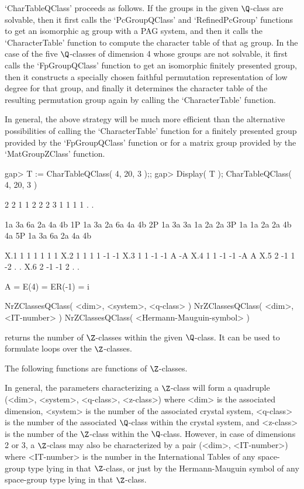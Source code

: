 `CharTableQClass' proceeds as follows.  If the groups in the given
$\Q$-class are solvable, then it first calls the `PcGroupQClass' and
`RefinedPcGroup' functions to get an isomorphic ag group with a PAG
system, and then it calls the `CharacterTable' function to compute the
character table of that ag group.  In the case of the five
$\Q$-classes of dimension 4 whose groups are not solvable, it first
calls the `FpGroupQClass' function to get an isomorphic finitely
presented group, then it constructs a specially chosen faithful
permutation representation of low degree for that group, and finally
it determines the character table of the resulting permutation group
again by calling the `CharacterTable' function.

In general, the above strategy will be much more efficient than the
alternative possibilities of calling the `CharacterTable' function for a
finitely presented group provided by the `FpGroupQClass' function or
for a matrix group provided by the `MatGroupZClass' function.

\beginexample
gap> T := CharTableQClass( 4, 20, 3 );;
gap> Display( T );
CharTableQClass( 4, 20, 3 )

     2  2  1  1  2  2  2
     3  1  1  1  1  .  .

       1a 3a 6a 2a 4a 4b
    1P 1a 3a 2a 6a 4a 4b
    2P 1a 3a 3a 1a 2a 2a
    3P 1a 1a 2a 2a 4b 4a
    5P 1a 3a 6a 2a 4a 4b

X.1     1  1  1  1  1  1
X.2     1  1  1  1 -1 -1
X.3     1  1 -1 -1  A -A
X.4     1  1 -1 -1 -A  A
X.5     2 -1  1 -2  .  .
X.6     2 -1 -1  2  .  .

A = E(4)
  = ER(-1) = i
\endexample


\>NrZClassesQClass( <dim>, <system>, <q-class> )
\>NrZClassesQClass( <dim>, <IT-number> )
\>NrZClassesQClass( <Hermann-Mauguin-symbol> )

returns the number of $\Z$-classes within the given $\Q$-class. It can
be used to formulate loops over the $\Z$-classes.

The following functions are functions of $\Z$-classes.

In general, the parameters characterizing a $\Z$-class will form a
quadruple (<dim>, <system>, <q-class>, <z-class>) where <dim> is the
associated dimension, <system> is the number of the associated crystal
system, <q-class> is the number of the associated $\Q$-class within
the crystal system, and <z-class> is the number of the $\Z$-class
within the $\Q$-class.  However, in case of dimensions 2 or 3, a
$\Z$-class may also be characterized by a pair (<dim>, <IT-number>)
where <IT-number> is the number in the International Tables
\cite{Hah83} of any space-group type lying in that $\Z$-class, or just
by the Hermann-Mauguin symbol of any space-group type lying in that
$\Z$-class.

